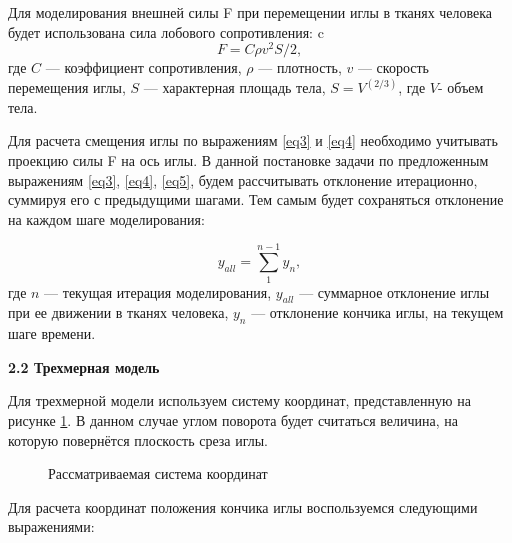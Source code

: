 \documentclass[10pt]{article}
\begin{document}
Для моделирования внешней силы F при перемещении иглы в тканях человека будет использована сила лобового сопротивления:
c\begin{equation} \label{eq5}
F = C \rho v^2 S /2, 
\end{equation}
где $C$ --- коэффициент сопротивления, $\rho$ --- плотность, $v$ --- скорость перемещения иглы, $S$ --- характерная площадь тела, $S = V^{(2/3)}$, где $V$- объем тела.

Для расчета смещения иглы по выражениям \eqref{eq3} и \eqref{eq4} необходимо учитывать проекцию силы F на ось иглы.
В данной постановке задачи по предложенным выражениям \eqref{eq3}, \eqref{eq4}, \eqref{eq5}, будем рассчитывать отклонение итерационно, суммируя его с предыдущими шагами. Тем самым будет сохраняться отклонение на каждом шаге моделирования:

\begin{equation} \label{eq6}
y_{all} = \sum\limits_{1}^{n-1} y_{n},
\end{equation}
где $n$ --- текущая итерация моделирования, $y_{all}$ --- суммарное отклонение иглы при ее движении в тканях человека, $y_{n}$ --- отклонение кончика иглы, на текущем шаге времени.


\bigskip
\textbf{2.2 Трехмерная модель}

Для трехмерной модели используем систему координат, представленную на рисунке \ref{n2}. В данном случае углом поворота будет считаться величина, на которую повернётся плоскость среза иглы.

\begin{figure}[h]
\caption{Рассматриваемая система координат}
\label{n2}
\end{figure}

Для расчета координат положения кончика иглы воспользуемся следующими выражениями:
\end{document}
